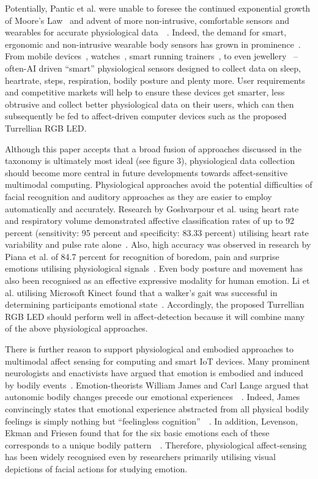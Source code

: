 \documentclass{sigchi}
\begin{document}
Potentially, Pantic et al. were unable to foresee the continued exponential growth of Moore’s Law~\cite{lundstrom2003moore} and advent of more non-intrusive, comfortable sensors and wearables for accurate physiological data~\cite{pantic2008human}~\cite{chen2012making}. Indeed, the demand for smart, ergonomic and non-intrusive wearable body sensors has grown in prominence~\cite{chen2012making}. From mobile devices~\cite{rodgers2014recent}, watches~\cite{kim2015acceptance}, smart running trainers~\cite{hurford2009types}, to even jewellery~\cite{ju2015smart} – often-AI driven “smart” physiological sensors designed to collect data on sleep, heartrate, steps, respiration, bodily posture and plenty more. User requirements and competitive markets will help to ensure these devices get smarter, less obtrusive and collect better physiological data on their users, which can then subsequently be fed to affect-driven computer devices such as the proposed Turrellian RGB LED. 

Although this paper accepts that a broad fusion of approaches discussed in the taxonomy is ultimately most ideal (see figure 3), physiological data collection should become more central in future developments towards affect-sensitive multimodal computing. Physiological approaches avoid the potential difficulties of facial recognition and auditory approaches as they are easier to employ automatically and accurately. Research by Goshvarpour et al. using heart rate and respiratory volume demonstrated affective classification rates of up to 92 percent (sensitivity: 95 percent and specificity: 83.33 percent) utilising heart rate variability and pulse rate alone~\cite{goshvarpour2017fusion}. Also, high accuracy was observed in research by Piana et al. of 84.7 percent for recognition of boredom, pain and surprise emotions utilising physiological signals~\cite{piana2014real}. Even body posture and movement has also been recognised as an effective expressive modality for human emotion. Li et al. utilising Microsoft Kinect found that a walker’s gait was successful in determining participants emotional state~\cite{li2016emotion}. Accordingly, the proposed Turrellian RGB LED should perform well in affect-detection because it will combine many of the above physiological approaches. 

There is further reason to support physiological and embodied approaches to multimodal affect sensing for computing and smart IoT devices. Many prominent neurologists and enactivists have argued that emotion is embodied and induced by bodily events~\cite{colombetti2008feeling}. Emotion-theorists William James and Carl Lange argued that autonomic bodily changes precede our emotional experiences~\cite{james1994physical}~\cite{lange1885om}. Indeed, James convincingly states that emotional experience abstracted from all physical bodily feelings is simply nothing but “feelingless cognition”~\cite{james1894discussion}~\cite{james1922emotions}. In addition, Levenson, Ekman and Friesen found that for the six basic emotions each of these corresponds to a unique bodily pattern~\cite{levenson1990voluntary}~\cite{prinz2004gut}. Therefore, physiological affect-sensing has been widely recognised even by researchers primarily utilising visual depictions of facial actions for studying emotion.
\end{document}
